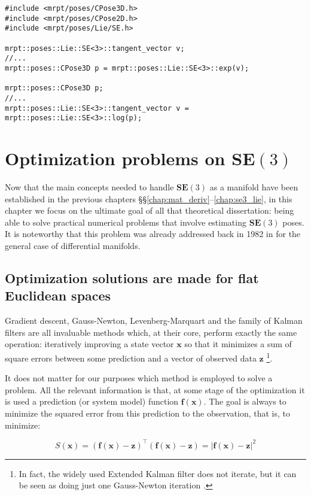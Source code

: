 \documentclass[a4paper,11pt]{report}
\begin{document}
\begin{lstlisting}
#include <mrpt/poses/CPose3D.h>
#include <mrpt/poses/CPose2D.h>
#include <mrpt/poses/Lie/SE.h>

mrpt::poses::Lie::SE<3>::tangent_vector v;
//...
mrpt::poses::CPose3D p = mrpt::poses::Lie::SE<3>::exp(v);

mrpt::poses::CPose3D p;
//...
mrpt::poses::Lie::SE<3>::tangent_vector v = mrpt::poses::Lie::SE<3>::log(p);
\end{lstlisting}


\chapter{Optimization problems on $\mathbf{SE}(3)$}
\label{ch:se3_optim}

Now that the main concepts needed to handle $\mathbf{SE}(3)$
as a manifold have been established in
the previous chapters \S\S\ref{chap:mat_deriv}--\ref{chap:se3_lie},
in this chapter we focus on the ultimate goal of all that theoretical
dissertation: being able to solve practical numerical
problems that involve
estimating $\mathbf{SE}(3)$ poses.
It is noteworthy that this problem was already addressed back in 1982 in \cite{gabay1982mdf} for the general case of differential manifolds.


\section{Optimization solutions are made for flat Euclidean spaces}

Gradient descent, Gauss-Newton, Levenberg-Marquart and the family of Kalman
filters are all
invaluable methods which, at their core, perform exactly the same operation:
iteratively improving a state vector $\mathbf{x}$ so that it minimizes
a sum of square errors between some prediction and a vector of observed data $\mathbf{z}$
\footnote{In fact, the widely used Extended Kalman filter does not iterate,
but it can be seen as doing just one Gauss-Newton iteration \cite{bell1993ikf}.}.

It does not matter for our purposes which method is employed to solve a problem.
All the relevant information is that, at some stage of the optimization
it is used a prediction (or system model) function
$\mathbf{f}(\mathbf{x})$.
The goal is always to minimize the squared error from
this prediction to the observation, that is,
to minimize:

\begin{equation}
S(\mathbf{x}) = (\mathbf{f}(\mathbf{x})-\mathbf{z})^\top (\mathbf{f}(\mathbf{x})-\mathbf{z})
 = | \mathbf{f}(\mathbf{x})-\mathbf{z} |^2
\end{equation}
\end{document}
